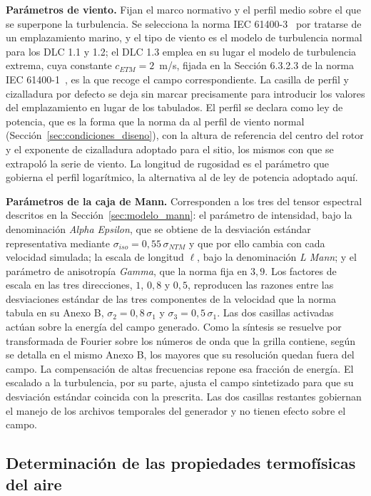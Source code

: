 \textbf{Parámetros de viento.} Fijan el marco normativo y el perfil medio sobre el que se superpone la turbulencia. Se selecciona la norma IEC 61400-3~\parencite*{IEC61400-3-2} por tratarse de un emplazamiento marino, y el tipo de viento es el modelo de turbulencia normal para los DLC 1.1 y 1.2; el DLC 1.3 emplea en su lugar el modelo de turbulencia extrema, cuya constante $c_{ETM} = 2$~m/s, fijada en la Sección 6.3.2.3 de la norma IEC 61400-1~\parencite*{IEC61400-1}, es la que recoge el campo correspondiente. La casilla de perfil y cizalladura por defecto se deja sin marcar precisamente para introducir los valores del emplazamiento en lugar de los tabulados. El perfil se declara como ley de potencia, que es la forma que la norma da al perfil de viento normal (Sección~\ref{sec:condiciones_diseno}), con la altura de referencia del centro del rotor y el exponente de cizalladura adoptado para el sitio, los mismos con que se extrapoló la serie de viento. La longitud de rugosidad es el parámetro que gobierna el perfil logarítmico, la alternativa al de ley de potencia adoptado aquí.

\textbf{Parámetros de la caja de Mann.} Corresponden a los tres del tensor espectral descritos en la Sección~\ref{sec:modelo_mann}: el parámetro de intensidad, bajo la denominación \textit{Alpha Epsilon}, que se obtiene de la desviación estándar representativa mediante $\sigma_{iso} = 0{,}55\,\sigma_{NTM}$ y que por ello cambia con cada velocidad simulada; la escala de longitud $\ell$, bajo la denominación \textit{L Mann}; y el parámetro de anisotropía \textit{Gamma}, que la norma fija en $3{,}9$. Los factores de escala en las tres direcciones, $1$, $0{,}8$ y $0{,}5$, reproducen las razones entre las desviaciones estándar de las tres componentes de la velocidad que la norma tabula en su Anexo B, $\sigma_2 = 0{,}8\,\sigma_1$ y $\sigma_3 = 0{,}5\,\sigma_1$. Las dos casillas activadas actúan sobre la energía del campo generado. Como la síntesis se resuelve por transformada de Fourier sobre los números de onda que la grilla contiene, según se detalla en el mismo Anexo B, los mayores que su resolución quedan fuera del campo. La compensación de altas frecuencias repone esa fracción de energía. El escalado a la turbulencia, por su parte, ajusta el campo sintetizado para que su desviación estándar coincida con la prescrita. Las dos casillas restantes gobiernan el manejo de los archivos temporales del generador y no tienen efecto sobre el campo.

\subsection{Determinación de las propiedades termofísicas del aire}
\label{sec:propiedades_aire}

